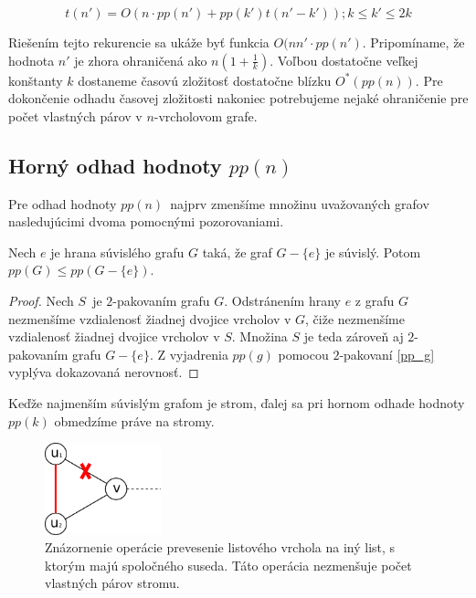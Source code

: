 $$t(n') = O(n \cdot pp(n') + pp(k')t(n' - k')); k \leq k' \leq 2k $$

Riešením tejto rekurencie sa ukáže byť funkcia $O(nn' \cdot pp(n')$. Pripomíname, že hodnota
$n'$ je zhora ohraničená ako $n(1 + \frac{1}{k})$. Voľbou dostatočne veľkej
konštanty $k$ dostaneme časovú zložitosť dostatočne blízku $O^*(pp(n))$. Pre dokončenie
odhadu časovej zložitosti nakoniec potrebujeme nejaké ohraničenie pre počet vlastných
párov v $n$-vrcholovom grafe.

\subsection{Horný odhad hodnoty $pp(n)$}

Pre odhad hodnoty $pp(n)$ najprv zmenšíme množinu uvažovaných grafov nasledujúcimi dvoma
pomocnými pozorovaniami.

\begin{lema}
    Nech $e$ je hrana súvislého grafu $G$ taká, že graf $G-\{e\}$ je súvislý. Potom
    $pp(G) \leq pp(G-\{e\})$.
\end{lema}

\begin{proof}
    Nech $S$ je $2$-pakovaním grafu $G$. Odstránením hrany $e$ z grafu $G$ nezmenšíme
    vzdialenosť žiadnej dvojice vrcholov v $G$, čiže nezmenšíme vzdialenosť žiadnej
    dvojice vrcholov v $S$. Množina $S$ je teda zároveň aj $2$-pakovaním grafu $G-\{e\}$.
    Z vyjadrenia $pp(g)$ pomocou $2$-pakovaní \ref{pp_g} vyplýva dokazovaná nerovnosť.
\end{proof}

Keďže najmenším súvislým grafom je strom, ďalej sa pri hornom odhade hodnoty $pp(k)$ obmedzíme
práve na stromy.

\begin{figure}

\centerline{\includegraphics[width=0.3\textwidth]{images/pp_prevesenie.pdf}}

\caption[Prevesenie listového vrcholu]{Znázornenie operácie prevesenie listového vrchola
na iný list, s ktorým majú spoločného suseda. Táto operácia nezmenšuje počet vlastných
párov stromu.}

\label{pp:prevesenie}

\end{figure}

